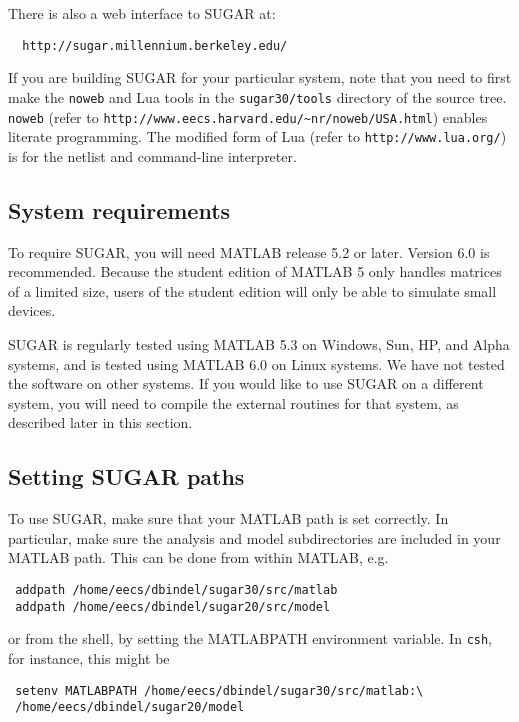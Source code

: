 There is also a web interface to SUGAR at:
\begin{verbatim}
  http://sugar.millennium.berkeley.edu/
\end{verbatim}

If you are building SUGAR for your particular system, note that you need to
first make the {\tt noweb} and Lua tools in the {\tt sugar30/tools} directory
of the source tree. {\tt noweb} (refer to {\tt http://www.eecs.harvard.edu/\~{}nr/noweb/USA.html}) enables literate programming. The modified form of Lua
(refer to {\tt http://www.lua.org/}) is for the netlist and 
command-line interpreter.


\subsection{System requirements}

To require SUGAR, you will need MATLAB release 5.2 or later. Version 6.0 is
recommended. Because the student edition of MATLAB 5 only handles matrices
of a limited size, users of the student edition will only be able
to simulate small devices.

SUGAR is regularly tested using MATLAB 5.3 on Windows, Sun, HP,
and Alpha systems, and is tested using MATLAB 6.0 on Linux systems.
We have not tested the software on other systems.
If you would like to use SUGAR on a different system,
you will need to compile the external routines for that system,
as described later in this section.

\subsection{Setting SUGAR paths}

To use SUGAR, make sure that your MATLAB path is set correctly.
In particular, make sure the analysis and model subdirectories are
included in your MATLAB path.  This can be done from within MATLAB, e.g.
\begin{verbatim}
 addpath /home/eecs/dbindel/sugar30/src/matlab
 addpath /home/eecs/dbindel/sugar20/src/model
\end{verbatim}
or from the shell, by setting the MATLABPATH environment variable.
In \texttt{csh}, for instance, this might be 
\begin{verbatim}
 setenv MATLABPATH /home/eecs/dbindel/sugar30/src/matlab:\
 /home/eecs/dbindel/sugar20/model
\end{verbatim}

